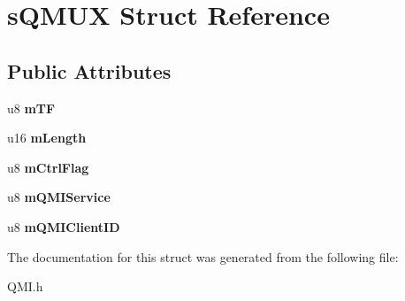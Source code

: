 \hypertarget{structsQMUX}{\section{s\-Q\-M\-U\-X \-Struct \-Reference}
\label{structsQMUX}
}
\subsection*{\-Public \-Attributes}
\begin{DoxyCompactItemize}
\item 
\hypertarget{structsQMUX_a89901eec54b88971bb65a3207cd9809d}{u8 {\bfseries m\-T\-F}}\label{structsQMUX_a89901eec54b88971bb65a3207cd9809d}

\item 
\hypertarget{structsQMUX_afe7ddc746040d73eddcc13f3f386fbe2}{u16 {\bfseries m\-Length}}\label{structsQMUX_afe7ddc746040d73eddcc13f3f386fbe2}

\item 
\hypertarget{structsQMUX_aa5032806b9e75d11f0682bb6efbae71e}{u8 {\bfseries m\-Ctrl\-Flag}}\label{structsQMUX_aa5032806b9e75d11f0682bb6efbae71e}

\item 
\hypertarget{structsQMUX_ace20d201bb4dfca58b5a0ac2e80580ca}{u8 {\bfseries m\-Q\-M\-I\-Service}}\label{structsQMUX_ace20d201bb4dfca58b5a0ac2e80580ca}

\item 
\hypertarget{structsQMUX_a24ae5b0e977929baff5e0e1bedd0f6f1}{u8 {\bfseries m\-Q\-M\-I\-Client\-I\-D}}\label{structsQMUX_a24ae5b0e977929baff5e0e1bedd0f6f1}

\end{DoxyCompactItemize}


\-The documentation for this struct was generated from the following file\-:\begin{DoxyCompactItemize}
\item 
\-Q\-M\-I.\-h\end{DoxyCompactItemize}
